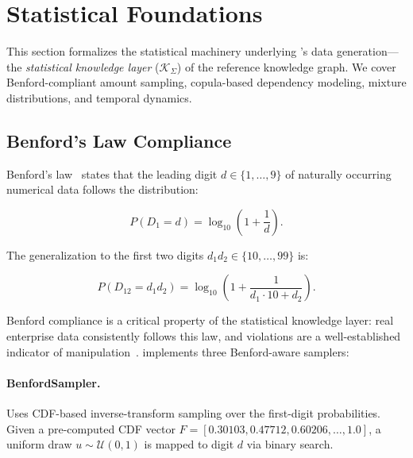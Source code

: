 \section{Statistical Foundations}
\label{sec:statistical_foundations}

This section formalizes the statistical machinery underlying \system{}'s
data generation---the \emph{statistical knowledge layer}
($\mathcal{K}_\Sigma$) of the reference knowledge graph.  We cover
Benford-compliant amount sampling, copula-based dependency modeling,
mixture distributions, and temporal dynamics.

\subsection{Benford's Law Compliance}
\label{sec:stat_benford}

Benford's law~\citep{benford1938law,nigrini2012benfords} states that the
leading digit $d \in \{1, \ldots, 9\}$ of naturally occurring numerical
data follows the distribution:

\begin{equation}
P(D_1 = d) = \log_{10}\!\left(1 + \frac{1}{d}\right).
\label{eq:benford_first}
\end{equation}

The generalization to the first two digits
$d_1 d_2 \in \{10, \ldots, 99\}$ is:

\begin{equation}
P(D_{12} = d_1 d_2) = \log_{10}\!\left(1 + \frac{1}{d_1 \cdot 10 + d_2}\right).
\label{eq:benford_two}
\end{equation}

Benford compliance is a critical property of the statistical knowledge
layer: real enterprise data consistently follows this law, and
violations are a well-established indicator of
manipulation~\citep{nigrini2012benfords}.  \system{} implements three
Benford-aware samplers:

\paragraph{BenfordSampler.}
Uses CDF-based inverse-transform sampling over the first-digit
probabilities.  Given a pre-computed CDF vector
$F = [0.30103, 0.47712, 0.60206, \ldots, 1.0]$, a uniform draw
$u \sim \mathcal{U}(0,1)$ is mapped to digit $d$ via binary search.

